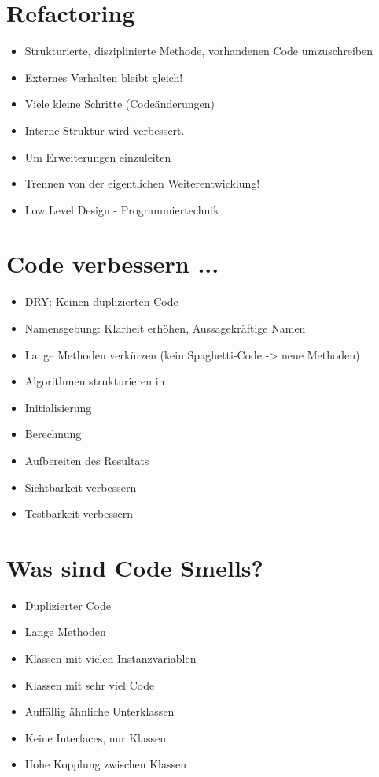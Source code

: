\documentclass[10pt]{article}
\begin{document}
\section*{Refactoring}
\begin{itemize}
  \item Strukturierte, disziplinierte Methode, vorhandenen Code umzuschreiben
  \item Externes Verhalten bleibt gleich!
  \item Viele kleine Schritte (Codeänderungen)
  \item Interne Struktur wird verbessert.
  \item Um Erweiterungen einzuleiten
  \item Trennen von der eigentlichen Weiterentwicklung!
  \item Low Level Design - Programmiertechnik
\end{itemize}

\section*{Code verbessern ...}
\begin{itemize}
  \item DRY: Keinen duplizierten Code
  \item Namensgebung: Klarheit erhöhen, Aussagekräftige Namen
  \item Lange Methoden verkürzen (kein Spaghetti-Code -> neue Methoden)
  \item Algorithmen strukturieren in
  \item Initialisierung
  \item Berechnung
  \item Aufbereiten des Resultats
  \item Sichtbarkeit verbessern
  \item Testbarkeit verbessern
\end{itemize}

\section*{Was sind Code Smells?}
\begin{itemize}
  \item Duplizierter Code
  \item Lange Methoden
  \item Klassen mit vielen Instanzvariablen
  \item Klassen mit sehr viel Code
  \item Auffällig ähnliche Unterklassen
  \item Keine Interfaces, nur Klassen
  \item Hohe Kopplung zwischen Klassen
\end{itemize}
\end{document}

